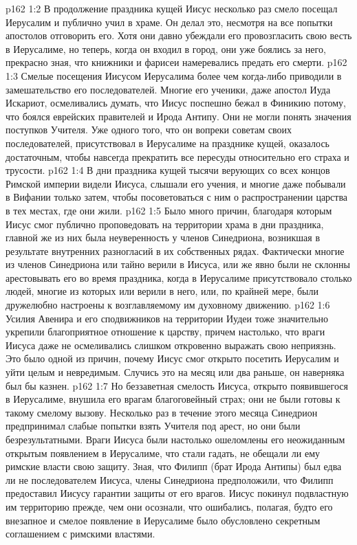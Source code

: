 \vs p162 1:2 В продолжение праздника кущей Иисус несколько раз смело посещал Иерусалим и публично учил в храме. Он делал это, несмотря на все попытки апостолов отговорить его. Хотя они давно убеждали его провозгласить свою весть в Иерусалиме, но теперь, когда он входил в город, они уже боялись за него, прекрасно зная, что книжники и фарисеи намеревались предать его смерти.
\vs p162 1:3 Смелые посещения Иисусом Иерусалима более чем когда\hyp{}либо приводили в замешательство его последователей. Многие его ученики, даже апостол Иуда Искариот, осмеливались думать, что Иисус поспешно бежал в Финикию потому, что боялся еврейских правителей и Ирода Антипу. Они не могли понять значения поступков Учителя. Уже одного того, что он вопреки советам своих последователей, присутствовал в Иерусалиме на празднике кущей, оказалось достаточным, чтобы навсегда прекратить все пересуды относительно его страха и трусости.
\vs p162 1:4 В дни праздника кущей тысячи верующих со всех концов Римской империи видели Иисуса, слышали его учения, и многие даже побывали в Вифании только затем, чтобы посоветоваться с ним о распространении царства в тех местах, где они жили.
\vs p162 1:5 Было много причин, благодаря которым Иисус смог публично проповедовать на территории храма в дни праздника, главной же из них была неуверенность у членов Синедриона, возникшая в результате внутренних разногласий в их собственных рядах. Фактически многие из членов Синедриона или тайно верили в Иисуса, или же явно были не склонны арестовывать его во время праздника, когда в Иерусалиме присутствовало столько людей, многие из которых или верили в него, или, по крайней мере, были дружелюбно настроены к возглавляемому им духовному движению.
\vs p162 1:6 Усилия Авенира и его сподвижников на территории Иудеи тоже значительно укрепили благоприятное отношение к царству, причем настолько, что враги Иисуса даже не осмеливались слишком откровенно выражать свою неприязнь. Это было одной из причин, почему Иисус смог открыто посетить Иерусалим и уйти целым и невредимым. Случись это на месяц или два раньше, он наверняка был бы казнен.
\vs p162 1:7 Но беззаветная смелость Иисуса, открыто появившегося в Иерусалиме, внушила его врагам благоговейный страх; они не были готовы к такому смелому вызову. Несколько раз в течение этого месяца Синедрион предпринимал слабые попытки взять Учителя под арест, но они были безрезультатными. Враги Иисуса были настолько ошеломлены его неожиданным открытым появлением в Иерусалиме, что стали гадать, не обещали ли ему римские власти свою защиту. Зная, что Филипп (брат Ирода Антипы) был едва ли не последователем Иисуса, члены Синедриона предположили, что Филипп предоставил Иисусу гарантии защиты от его врагов. Иисус покинул подвластную им территорию прежде, чем они осознали, что ошибались, полагая, будто его внезапное и смелое появление в Иерусалиме было обусловлено секретным соглашением с римскими властями.
